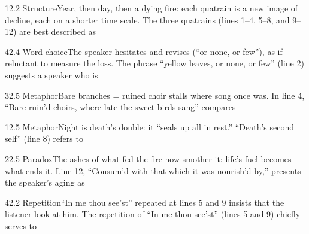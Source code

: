 \documentclass[11pt]{article}
\begin{document}
\begin{q}{1}{2.2 Structure}{Year, then day, then a dying fire: each quatrain is a new image of decline, each on a shorter time scale.}
The three quatrains (lines 1--4, 5--8, and 9--12) are best described as
\end{q}

\begin{q}{4}{2.4 Word choice}{The speaker hesitates and revises (``or none, or few''), as if reluctant to measure the loss.}
The phrase ``yellow leaves, or none, or few'' (line 2) suggests a speaker who is
\end{q}

\begin{q}{3}{2.5 Metaphor}{Bare branches = ruined choir stalls where song once was.}
In line 4, ``Bare ruin'd choirs, where late the sweet birds sang'' compares
\end{q}

\begin{q}{1}{2.5 Metaphor}{Night is death's double: it ``seals up all in rest.''}
``Death's second self'' (line 8) refers to
\end{q}

\begin{q}{2}{2.5 Paradox}{The ashes of what fed the fire now smother it: life's fuel becomes what ends it.}
Line 12, ``Consum'd with that which it was nourish'd by,'' presents the speaker's aging as
\end{q}

\begin{q}{4}{2.2 Repetition}{``In me thou see'st'' repeated at lines 5 and 9 insists that the listener look at him.}
The repetition of ``In me thou see'st'' (lines 5 and 9) chiefly serves to
\end{q}
\end{document}
